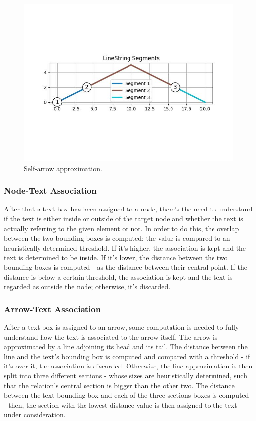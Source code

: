 \documentclass[conference]{IEEEtran}
\begin{document}
\begin{figure}
	\centering
	\includegraphics[width=\linewidth]{self_arrow.jpeg}
	\caption{Self-arrow approximation.}
	\label{fig:arrowsplit}
\end{figure}

\subsubsection{Node-Text Association}
After that a text box has been assigned to a node, there's the need to understand if the text is either inside or outside of the target node and whether the text is actually referring to the given element or not. In order to do this, the overlap between the two bounding boxes is computed; the value is compared to an heuristically determined threshold. If it's higher, the association is kept and the text is determined to be inside. If it's lower, the distance between the two bounding boxes is computed - as the distance between their central point. If the distance is below a certain threshold, the association is kept and the text is regarded as outside the node; otherwise, it's discarded.\\

\subsubsection{Arrow-Text Association}
After a text box is assigned to an arrow, some computation is needed to fully understand how the text is associated to the arrow itself. The arrow is approximated by a line adjoining its head and its tail.
The distance between the line and the text's bounding box is computed and compared with a threshold - if it's over it, the association is discarded.
Otherwise, the line approximation is then split into three different sections - whose sizes are heuristically determined, such that the relation's central section is bigger than the other two. The distance between the text bounding box and each of the three sections boxes is computed - then, the section with the lowest distance value is then assigned to the text under consideration. \\
\end{document}
